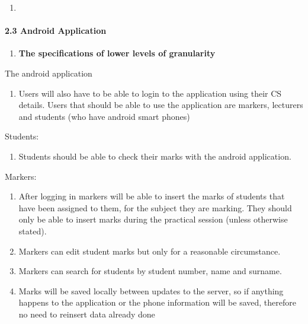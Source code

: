 \documentclass{article}
\begin{document}
\begin{enumerate}
\item \textbf{ }
\end{enumerate}

\noindent  

\noindent 

\noindent 

\noindent 

\noindent 


\paragraph{2.3  Android Application}

\noindent 

\begin{enumerate}
\item  \textbf{The specifications of lower levels of granularity}
\end{enumerate}

 

\noindent The android application

\begin{enumerate}
\item  Users will also have to be able to login to the application using their CS details. Users that should be able to use the application are markers, lecturers and students (who have android smart phones) 
\end{enumerate}

\noindent 

\noindent Students: 

\begin{enumerate}
\item  Students should be able to check their marks with the android application. 
\end{enumerate}

\noindent 

\noindent Markers: 

\begin{enumerate}
\item  After logging in markers will be able to insert the marks of students that have been assigned to them, for the subject they are marking. They should only be able to insert marks during the practical session (unless otherwise stated). 

\item  Markers can edit student marks but only for a reasonable circumstance. 

\item  Markers can search for students by student number, name and surname.

\item  Marks will be saved locally between updates to the server, so if anything happens to the application or the phone information will be saved, therefore no need to reinsert data already done
\end{enumerate}
\end{document}
